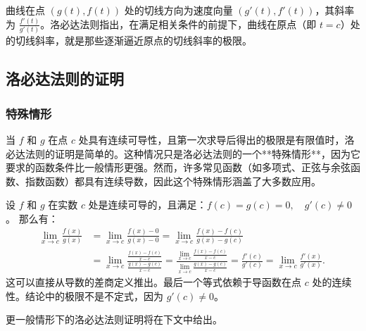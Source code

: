 曲线在点 $(g(t), f(t))$ 处的切线方向为速度向量 $(g'(t), f'(t))$，其斜率为 $\frac{f'(t)}{g'(t)}$。洛必达法则指出，在满足相关条件的前提下，曲线在原点（即 $t = c$）处的切线斜率，就是那些逐渐逼近原点的切线斜率的极限。
\subsection{洛必达法则的证明}
\subsubsection{特殊情形}
当 $f$ 和 $g$ 在点 $c$ 处具有连续可导性，且第一次求导后得出的极限是有限值时，洛必达法则的证明是简单的。这种情况只是洛必达法则的一个**特殊情形**，因为它要求的函数条件比一般情形更强。然而，许多常见函数（如多项式、正弦与余弦函数、指数函数）都具有连续导数，因此这个特殊情形涵盖了大多数应用。

设 $f$ 和 $g$ 在实数 $c$ 处是连续可导的，且满足：$f(c) = g(c) = 0,\quad g'(c) \neq 0$。
那么有：
$$
\begin{aligned}
\lim_{x \to c} \frac{f(x)}{g(x)}
&= \lim_{x \to c} \frac{f(x) - 0}{g(x) - 0}= \lim_{x \to c} \frac{f(x) - f(c)}{g(x) - g(c)} \\
&= \lim_{x \to c} \frac{\frac{f(x) - f(c)}{x - c}}{\frac{g(x) - g(c)}{x - c}} = \frac{\lim\limits_{x \to c} \frac{f(x) - f(c)}{x - c}}{\lim\limits_{x \to c} \frac{g(x) - g(c)}{x - c}}= \frac{f'(c)}{g'(c)} = \lim_{x \to c} \frac{f'(x)}{g'(x)}.
\end{aligned}~
$$
这可以直接从导数的差商定义推出。最后一个等式依赖于导函数在点 $c$ 处的连续性。结论中的极限不是不定式，因为 $g'(c) \neq 0$。

更一般情形下的洛必达法则证明将在下文中给出。